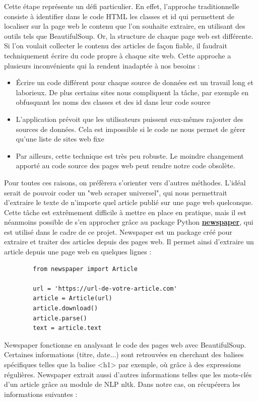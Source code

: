 \documentclass[french]{article}
\begin{document}
    Cette étape représente un défi particulier. En effet, l'approche traditionnelle consiste à identifier dans le code HTML les classes et id qui permettent de localiser sur la page web le contenu que l'on souhaite extraire, en utilisant des outils tels que BeautifulSoup. Or, la structure de chaque page web est différente. Si l'on voulait collecter le contenu des articles de façon fiable, il faudrait techniquement écrire du code propre à chaque site web. Cette approche a plusieurs inconvénients qui la rendent inadaptée à nos besoins :
    \begin{itemize}
        \item Écrire un code différent pour chaque source de données est un travail long et laborieux. De plus certains sites nous compliquent la tâche, par exemple en obfusquant les noms des classes et des id dans leur code source
        \item L'application prévoit que les utilisateurs puissent eux-mêmes rajouter des sources de données. Cela est impossible si le code ne nous permet de gérer qu'une liste de sites web fixe
        \item Par ailleurs, cette technique est très peu robuste. Le moindre changement apporté au code source des pages web peut rendre notre code obsolète.
    \end{itemize}
    Pour toutes ces raisons, on préfèrera s'orienter vers d'autres méthodes. L'idéal serait de pouvoir coder un "web scraper universel", qui nous permettrait d'extraire le texte de n'importe quel article publié sur une page web quelconque. Cette tâche est extrêmement difficile à mettre en place en pratique, mais il est néanmoins possible de s'en approcher grâce au package Python \textbf{\href{https://newspaper.readthedocs.io/en/latest/}{newspaper}}, qui est utilisé dans le cadre de ce projet.
    Newspaper est un package créé pour extraire et traiter des articles depuis des pages web. Il permet ainsi d'extraire un article depuis une page web en quelques lignes :
    \begin{verbatim}
        from newspaper import Article

        url = 'https://url-de-votre-article.com'
        article = Article(url)
        article.download()
        article.parse()
        text = article.text
    \end{verbatim}
    Newspaper fonctionne en analysant le code des pages web avec BeautifulSoup. Certaines informations (titre, date...) sont retrouvées en cherchant des balises spécifiques telles que la balise <h1> par exemple, où grâce à des expressions régulières. Newspaper extrait aussi d'autres informations telles que les mots-clés d'un article grâce au module de NLP nltk. Dans notre cas, on récupérera les informations suivantes :
\end{document}
